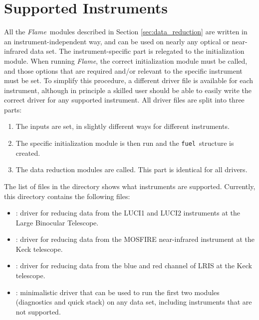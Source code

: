 \documentclass[a4paper]{article}
\newcommand{\flame}{\emph{Flame}}
\newcommand{\fuel}{\texttt{fuel}}
\begin{document}
\begin{sloppypar}

\section{Supported Instruments}
\label{sec:instruments}

All the \flame\ modules described in Section \ref{sec:data_reduction} are written in an instrument-independent way, and can be used on nearly any optical or near-infrared data set. The instrument-specific part is relegated to the initialization module. When running \flame, the correct initialization module must be called, and those options that are required and/or relevant to the specific instrument must be set. To simplify this procedure, a different driver file is available for each instrument, although in principle a skilled user should be able to easily write the correct driver for any supported instrument. All driver files are split into three parts:
\begin{enumerate}
  \item The inputs are set, in slightly different ways for different instruments.
  \item The specific initialization module is then run and the \fuel\ structure is created.
  \item The data reduction modules are called. This part is identical for all drivers.
\end{enumerate}

The list of files in the  directory shows what instruments are supported. Currently, this directory contains the following files:
\begin{itemize}
  \item[] : driver for reducing data from the LUCI1 and LUCI2 instruments at the Large Binocular Telescope.
  \item[] : driver for reducing data from the MOSFIRE near-infrared instrument at the Keck telescope.
  \item[] : driver for reducing data from the blue and red channel of LRIS at the Keck telescope.
  \item[] : minimalistic driver that can be used to run the first two modules (diagnostics and quick stack) on any data set, including instruments that are not supported.
\end{itemize}


\end{sloppypar}
\end{document}

